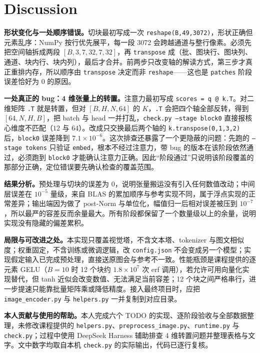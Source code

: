 \documentclass[a4paper,12pt]{article}
\begin{document}
\section{Discussion}

\textbf{形状变化与一处顺序错误。}切块最初写成一次 \texttt{reshape(B,49,3072)}，形状正确但元素乱序：NumPy 按行优先展平，每一段 3072 会跨越通道与整行像素。必须先把空间轴拆成两段 $[B,3,7,32,7,32]$，再 \texttt{transpose} 成（批、图块行、图块列、通道、块内行、块内列），最后才合并。前两步只改变轴的解读方式，第三步才真正重排内存，所以顺序由 \texttt{transpose} 决定而非 \texttt{reshape}——这也是 \texttt{patches} 阶段误差恰好为 $0$ 的原因。

\textbf{一处真正的 bug：4 维张量上的转置。}注意力最初写成 \texttt{scores = q @ k.T}。对二维矩阵 \texttt{.T} 就是转置，但对 $[B,H,N,64]$ 的 $K$，\texttt{.T} 会把四个轴全部反转，得到 $[64,N,H,B]$，把 batch 与 head 一并打乱，\texttt{check.py --stage block0} 直接报核心维度不匹配（$12$ 与 $64$）。改成只交换最后两个轴的 \texttt{k.transpose(0,1,3,2)} 后，\texttt{block0} 误差降到 $7.1\times10^{-6}$。这次排查还暴露了一个更隐蔽的问题：先跑的 \texttt{--stage tokens} 只验证 \texttt{embed}，根本不经过注意力，带 bug 的版本在该阶段依然通过，必须跑到 \texttt{block0} 才能确认注意力正确。因此“阶段通过”只说明该阶段覆盖的那部分正确，定位错误要先确认检查的覆盖范围。

\textbf{结果分析。}预处理与切块的误差为 $0$，说明张量搬运没有引入任何数值改动；中间层误差在 $10^{-5}$ 量级，来自 BLAS 的累加顺序与参考实现不同，属于浮点实现的正常差异；输出端因为做了 post-Norm 与单位化，幅值归一后相对误差被压到 $10^{-7}$，所以最严的容差反而余量最大。所有阶段都保留了一个数量级以上的余量，说明实现没有隐藏的偏差累积。

\textbf{局限与可改进之处。}本实现只覆盖视觉塔，不含文本塔、tokenizer 与图文相似度；权重固定，不含训练或微调逻辑，改 \texttt{config.json} 不会变成另一个模型；实现假定输入已完成预处理，直接送原图会与参考不一致。性能瓶颈是课程提供的逐元素 GELU（$B=10$ 时 12 个块约 $1.8\times10^{7}$ 次 erf 调用），若允许可用向量化实现替代，但 tanh 近似会改变数值、无法满足当前容差；12 个块之间严格串行，进一步提速只能靠批量矩阵乘或降低精度。接入最终项目时，应把 \texttt{image\_encoder.py} 与 \texttt{helpers.py} 一并复制到对应目录。

\textbf{本人贡献与使用的帮助。}本人完成六个 TODO 的实现、逐阶段验收与全部数据整理，未修改课程提供的 \texttt{helpers.py}、\texttt{preprocess\_image.py}、\texttt{runtime.py} 与 \texttt{check.py}；过程中使用 DeepSeek Harness 辅助排查 4 维转置问题并整理表格与文字。文中数字均取自本机 \texttt{check.py} 的实际输出，代码已逐行复核。
\end{document}
